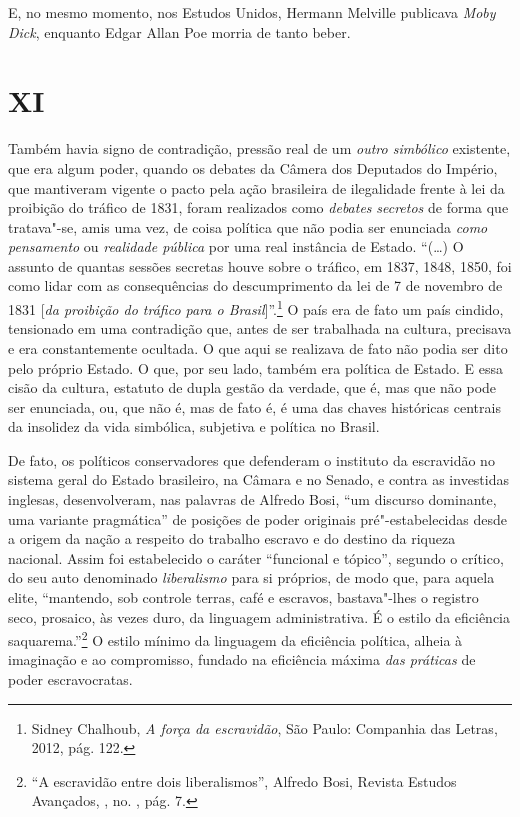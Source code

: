 E, no mesmo momento, nos Estudos Unidos, Hermann Melville publicava
\emph{Moby Dick}, enquanto Edgar Allan Poe morria de tanto beber.

\section{XI}

Também havia signo de contradição, pressão real de um \emph{outro
simbólico} existente, que era algum poder, quando os debates da Câmera
dos Deputados do Império, que mantiveram vigente o pacto pela ação
brasileira de ilegalidade frente à lei da proibição do tráfico de 1831,
foram realizados como \emph{debates} \emph{secretos} de forma que
tratava"-se, amis uma vez, de coisa política que não podia ser enunciada
\emph{como pensamento} ou \emph{realidade pública} por uma real
instância de Estado. ``(\ldots{}) O assunto de quantas sessões secretas houve
sobre o tráfico, em 1837, 1848, 1850, foi como lidar com as
consequências do descumprimento da lei de 7 de novembro de 1831
{[}\emph{da proibição do tráfico para o Brasil}{]}''.\footnote{Sidney
  Chalhoub, \emph{A força da escravidão}, São Paulo: Companhia das
  Letras, 2012, pág. 122.} O país era de fato um país cindido,
tensionado em uma contradição que, antes de ser trabalhada na cultura,
precisava e era constantemente ocultada. O que aqui se realizava de fato
não podia ser dito pelo próprio Estado. O que, por seu lado, também era
política de Estado. E essa cisão da cultura, estatuto de dupla gestão da
verdade, que é, mas que não pode ser enunciada, ou, que não é, mas de
fato é, é uma das chaves históricas centrais da insolidez da vida
simbólica, subjetiva e política no Brasil.

De fato, os políticos conservadores que defenderam o instituto da
escravidão no sistema geral do Estado brasileiro, na Câmara e no Senado,
e contra as investidas inglesas, desenvolveram, nas palavras de Alfredo
Bosi, ``um discurso dominante, uma variante pragmática'' de posições de
poder originais pré"-estabelecidas desde a origem da nação a respeito do
trabalho escravo e do destino da riqueza nacional. Assim foi
estabelecido o caráter ``funcional e tópico'', segundo o crítico, do seu
auto denominado \emph{liberalismo} para si próprios, de modo que, para
aquela elite, ``mantendo, sob controle terras, café e escravos,
bastava"-lhes o registro seco, prosaico, às vezes duro, da linguagem
administrativa. É o estilo da eficiência saquarema.''\footnote{``A
  escravidão entre dois liberalismos'', Alfredo Bosi, Revista Estudos
  Avançados, , no. , pág. 7.} O estilo mínimo da linguagem da
eficiência política, alheia à imaginação e ao compromisso, fundado na
eficiência máxima \emph{das práticas} de poder escravocratas.

